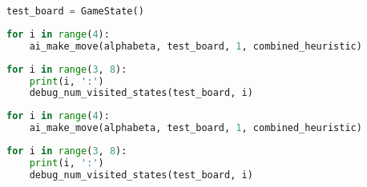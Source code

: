 \begin{lstlisting}[language=Python]
%run othello_test_util.ipynb
\end{lstlisting}

\begin{lstlisting}[language=Python]
test_board = GameState()
\end{lstlisting}

\begin{lstlisting}[language=Python]
for i in range(4):
    ai_make_move(alphabeta, test_board, 1, combined_heuristic)
\end{lstlisting}

\begin{lstlisting}[language=Python]
for i in range(3, 8):
    print(i, ':')
    debug_num_visited_states(test_board, i)
\end{lstlisting}

\begin{lstlisting}[language=Python]
for i in range(4):
    ai_make_move(alphabeta, test_board, 1, combined_heuristic)
\end{lstlisting}

\begin{lstlisting}[language=Python]
for i in range(3, 8):
    print(i, ':')
    debug_num_visited_states(test_board, i)
\end{lstlisting}
